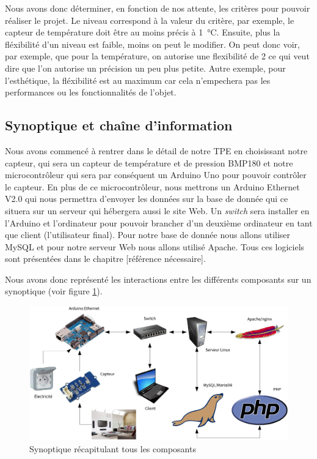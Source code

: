 Nous avons donc déterminer, en fonction de nos attente, les critères pour pouvoir réaliser le projet. Le niveau correspond à la valeur du critère, par exemple, le capteur de température doit être au moins précis à \SI{1}{\celsius}. Ensuite, plus la fléxibilité d'un niveau est faible, moins on peut le modifier. On peut donc voir, par exemple, que pour la température, on autorise une flexibilité de 2 ce qui veut dire que l'on autorise un précision un peu plus petite. Autre exemple, pour l'esthétique, la fléxibilité est au maximum car cela n'empechera pas les performances ou les fonctionnalités de l'objet.

\subsection{Synoptique et chaîne d'information}

Nous avons commencé à rentrer dans le détail de notre TPE en choisissant notre capteur, qui sera un capteur de température et de pression BMP180 et notre microcontrôleur qui sera par conséquent un Arduino Uno pour pouvoir contrôler le capteur. En plus de ce microcontrôleur, nous mettrons un Arduino Ethernet V2.0 qui nous permettra d'envoyer les données sur la base de donnée qui ce situera sur un serveur qui hébergera aussi le site Web. Un \emph{switch} sera installer en l'Arduino et l'ordinateur pour pouvoir brancher d'un deuxième ordinateur en tant que client (l'utilisateur final). Pour notre base de donnée nous allons utiliser MySQL et pour notre serveur Web nous allons utilisé Apache. Tous ces logiciels sont présentées dans le chapitre [référence nécessaire].

Nous avons donc représenté les interactions entre les différents composants sur un synoptique (voir figure \ref{figure:synoptique}).

\begin{figure}[!h]
	\centering
	\includegraphics[width=.9\linewidth]{Images/Synoptique}
	\caption{Synoptique récapitulant tous les composants}
	\label{figure:synoptique}
\end{figure}

